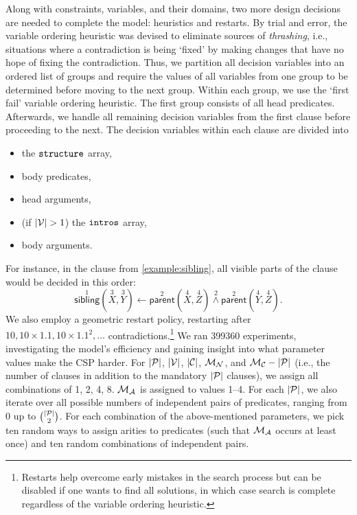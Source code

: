 Along with constraints, variables, and their domains, two more design decisions
are needed to complete the model: heuristics and restarts. By trial and error,
the variable ordering heuristic was devised to eliminate sources of
\emph{thrashing}, i.e., situations where a contradiction is being `fixed' by
making changes that have no hope of fixing the contradiction. Thus, we partition
all decision variables into an ordered list of groups and require the values of
all variables from one group to be determined before moving to the next group.
Within each group, we use the `first fail' variable ordering heuristic. The
first group consists of all head predicates. Afterwards, we handle all remaining
decision variables from the first clause before proceeding to the next. The
decision variables within each clause are divided into
\begin{itemize}
\item the $\texttt{\textup{structure}}$ array,
\item body predicates,
\item head arguments,
\item (if $|\mathcal{V}{}| > 1$) the $\texttt{\textup{intros}}$ array,
\item body arguments.
\end{itemize}
For instance, in the clause from \cref{example:sibling}, all visible parts of
the clause would be decided in this order:
\[
  \overset{1}{\mathsf{sibling}}(\overset{3}{X}, \overset{3}{Y}) \gets
  \overset{2}{\mathsf{parent}}(\overset{4}{X}, \overset{4}{Z})
  \overset{2}{\land} \overset{2}{\mathsf{parent}}(\overset{4}{Y},
  \overset{4}{Z}).
\]
We also employ a geometric restart policy, restarting after $10, 10 \times 1.1,
10 \times 1.1^2, \dots$ contradictions.\footnote{Restarts help overcome early
  mistakes in the search process but can be disabled if one wants to find all
  solutions, in which case search is complete regardless of the variable
  ordering heuristic.} We ran \num{399360} experiments, investigating the
model's efficiency and gaining insight into what parameter values make the CSP
harder. For $|\mathcal{P}{}|$, $|\mathcal{V}{}|$, $|\mathcal{C}{}|$,
$\mathcal{M}_{\mathcal{N}}{}$, and $\mathcal{M}_{\mathcal{C}}{} - |\mathcal{P}{}|$ (i.e., the number of
clauses in addition to the mandatory $|\mathcal{P}{}|$ clauses), we assign all
combinations of 1, 2, 4, 8. $\mathcal{M}_{\mathcal{A}}{}$ is assigned to values 1--4. For each
$|\mathcal{P}{}|$, we also iterate over all possible numbers of independent
pairs of predicates, ranging from 0 up to $\binom{|\mathcal{P}{}|}{2}$. For each
combination of the above-mentioned parameters, we pick ten random ways to assign
arities to predicates (such that $\mathcal{M}_{\mathcal{A}}{}$ occurs at least once) and ten
random combinations of independent pairs.

